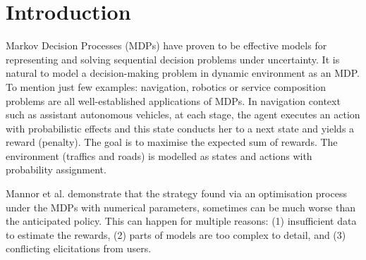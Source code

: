 \documentclass[runningheads,a4paper]{llncs}
\begin{document}
\section{Introduction}



Markov Decision Processes (MDPs) have proven to be effective models for representing and solving sequential decision problems under uncertainty. It is natural to model a decision-making problem in dynamic environment as an MDP. To mention just few examples: navigation, robotics or service composition problems are all well-established applications of MDPs. In navigation context such as assistant autonomous vehicles, at each stage, the agent executes an action with probabilistic effects and this state conducts her to a next state and yields a reward (penalty). The goal is to maximise the expected sum of rewards. The environment %
 (traffics and roads) is modelled as states and actions with probability assignment.%
 
 
Mannor et al.  demonstrate that the strategy found via an optimisation process under the MDPs with numerical parameters, sometimes can be much worse than the anticipated policy. This can happen for multiple reasons:
(1) insufficient data to estimate the rewards,
(2) parts of models are too complex to detail, %
and (3) conflicting elicitations from users. %
\end{document}

